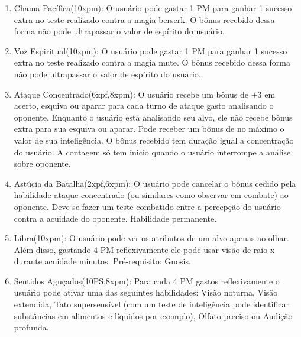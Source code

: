 \begin{enumerate}
	\item Chama Pacífica(10xpm): O usuário pode gastar 1 PM para ganhar 1 sucesso extra no teste realizado contra a magia berserk. O bônus recebido dessa forma não pode ultrapassar o valor de espírito do usuário.
		
	\item Voz Espiritual(10xpm): O usuário pode gastar 1 PM para ganhar 1 sucesso extra no teste realizado contra a magia mute. O bônus recebido dessa forma não pode ultrapassar o valor de espírito do usuário.

	\item Ataque Concentrado(6xpf,8xpm): O usuário recebe um bônus de +3 em acerto, esquiva ou aparar para cada turno de ataque gasto analisando o oponente. Enquanto o usuário está analisando seu alvo, ele não recebe bônus extra para sua esquiva ou aparar. Pode receber um bônus de no máximo o valor de sua inteligência. O bônus recebido tem duração igual a concentração do usuário. A contagem só tem inicio quando o usuário interrompe a análise sobre oponente.

	\item Astúcia da Batalha(2xpf,6xpm): O usuário pode cancelar o bônus cedido pela habilidade ataque concentrado (ou similares como observar em combate) ao oponente. Deve-se fazer um teste combatido entre a percepção do usuário contra a acuidade do oponente. Habilidade permanente.
	

	\item Libra(10xpm): O usuário pode ver os atributos de um alvo apenas ao olhar. Além disso, gastando 4 PM reflexivamente ele pode usar visão de raio x durante acuidade minutos. Pré-requisito: Gnosis.
	
	\item Sentidos Aguçados(10PS,8xpm): Para cada 4 PM gastos reflexivamente o usuário pode ativar uma das seguintes habilidades: Visão noturna, Visão extendida, Tato supersensível (com um teste de inteligência pode identificar substâncias em alimentos e líquidos por exemplo), Olfato preciso ou Audição profunda.



\end{enumerate}
